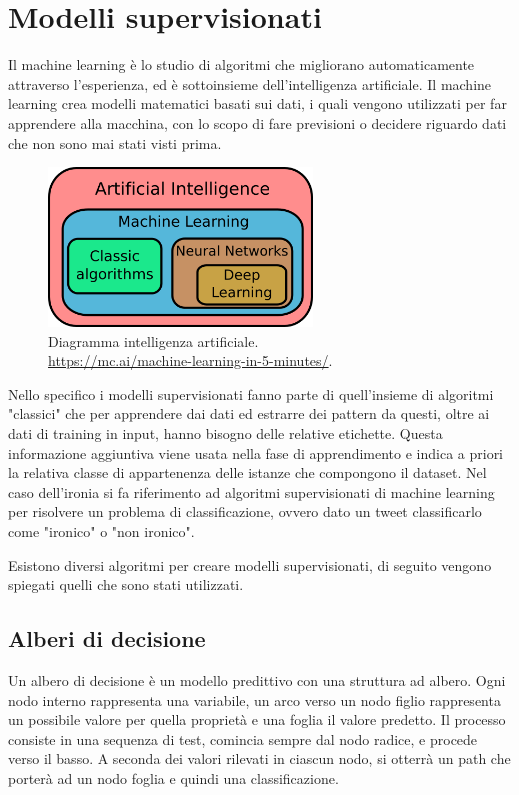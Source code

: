 \documentclass[oneside]{book}
\begin{document}
\section{Modelli supervisionati}
Il machine learning è lo studio di algoritmi che migliorano automaticamente attraverso l'esperienza, ed è sottoinsieme dell'intelligenza artificiale. Il machine learning crea modelli matematici basati sui dati, i quali vengono utilizzati per far apprendere alla macchina, con lo scopo di fare previsioni o decidere riguardo dati che non sono mai stati visti prima.


\begin{figure}[!h]
	\centering
	\includegraphics[width=7cm]{assets/ai_diagram.png}
	\caption{Diagramma intelligenza artificiale. \\ \url{https://mc.ai/machine-learning-in-5-minutes/}.}
	\label{fig:artificial-intelligence}
\end{figure}

Nello specifico i modelli supervisionati fanno parte di quell'insieme di algoritmi "classici" che per apprendere dai dati ed estrarre dei pattern da questi, oltre ai dati di training in input, hanno bisogno delle relative etichette. Questa informazione aggiuntiva viene usata nella fase di apprendimento e indica a priori la relativa classe di appartenenza delle istanze che compongono il dataset. Nel caso dell'ironia si fa riferimento ad algoritmi supervisionati di machine learning per risolvere un problema di classificazione, ovvero dato un tweet classificarlo come "ironico" o "non ironico".

Esistono diversi algoritmi per creare modelli supervisionati, di seguito vengono spiegati quelli che sono stati utilizzati.

\subsection{Alberi di decisione}
Un albero di decisione è un modello predittivo con una struttura ad albero. Ogni nodo interno rappresenta una variabile, un arco verso un nodo figlio rappresenta un possibile valore per quella proprietà e una foglia il valore predetto. Il processo consiste in una sequenza di test, comincia sempre dal nodo radice, e procede verso il basso. A seconda dei valori rilevati in ciascun nodo, si otterrà un path che porterà ad un nodo foglia e quindi una classificazione.
\end{document}
